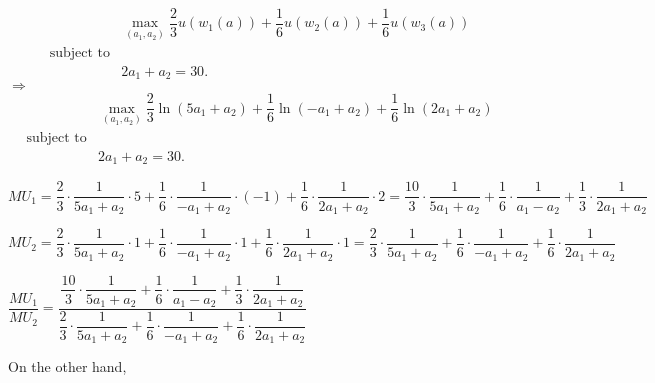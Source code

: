 \documentclass{article}
\begin{document}
\begin{equation*}
    \begin{aligned}
    & \max_{\left(a_{1},a_{2}\right)}
      \dfrac{2}{3}u\left(w_{1}\left(a\right)\right)+\dfrac{1}{6}u\left(w_{2}\left(a\right)\right)+\dfrac{1}{6}u\left(w_{3}\left(a\right)\right)\\
     \text{subject to}\\
    &   2a_{1}+a_{2}=30.
    \end{aligned}
\end{equation*}
$\Longrightarrow$
\begin{equation*}
    \begin{aligned}
    & \max_{\left(a_{1},a_{2}\right)}
    \dfrac{2}{3}\ln\left(5a_{1}+a_{2}\right)+\dfrac{1}{6}\ln\left(-a_{1}+a_{2}\right)+\dfrac{1}{6}\ln\left(2a_{1}+a_{2}\right)\\
      \text{subject to}\\
    &  2a_{1}+a_{2}=30.
    \end{aligned}
\end{equation*}

$MU_{1}=\dfrac{2}{3}\cdot\dfrac{1}{5a_{1}+a_{2}}\cdot5+\dfrac{1}{6}\cdot\dfrac{1}{-a_{1}+a_{2}}\cdot\left(-1\right)+\dfrac{1}{6}\cdot\dfrac{1}{2a_{1}+a_{2}}\cdot2=\dfrac{10}{3}\cdot\dfrac{1}{5a_{1}+a_{2}}+\dfrac{1}{6}\cdot\dfrac{1}{a_{1}-a_{2}}+\dfrac{1}{3}\cdot\dfrac{1}{2a_{1}+a_{2}}$

$MU_{2}=\dfrac{2}{3}\cdot\dfrac{1}{5a_{1}+a_{2}}\cdot1+\dfrac{1}{6}\cdot\dfrac{1}{-a_{1}+a_{2}}\cdot1+\dfrac{1}{6}\cdot\dfrac{1}{2a_{1}+a_{2}}\cdot1=\dfrac{2}{3}\cdot\dfrac{1}{5a_{1}+a_{2}}+\dfrac{1}{6}\cdot\dfrac{1}{-a_{1}+a_{2}}+\dfrac{1}{6}\cdot\dfrac{1}{2a_{1}+a_{2}}$

$\dfrac{MU_{1}}{MU_{2}}=\dfrac{\dfrac{10}{3}\cdot\dfrac{1}{5a_{1}+a_{2}}+\dfrac{1}{6}\cdot\dfrac{1}{a_{1}-a_{2}}+\dfrac{1}{3}\cdot\dfrac{1}{2a_{1}+a_{2}}}{\dfrac{2}{3}\cdot\dfrac{1}{5a_{1}+a_{2}}+\dfrac{1}{6}\cdot\dfrac{1}{-a_{1}+a_{2}}+\dfrac{1}{6}\cdot\dfrac{1}{2a_{1}+a_{2}}}$

On the other hand, 
\end{document}
